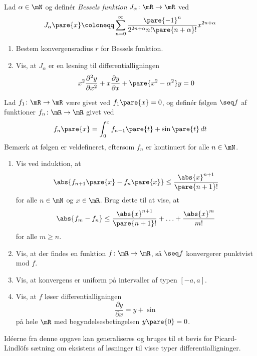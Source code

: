 \begin{opg} \hfill \\
Lad $\alpha\in\mN$ og definér \textit{Bessels funktion} $J_\alpha\colon \mR\to\mR$ ved
$$ J_\alpha\pare{x}\coloneqq \sum_{n=0}^\infty
    \frac{\pare{-1}^n}{2^{2n+\alpha}n!\pare{n+\alpha}!}x^{2n+\alpha} $$
\begin{enumerate}
    \item Bestem konvergensradius $r$ for Bessels funktion.
    
    \item Vis, at $J_\alpha$ er en løsning til differentialligningen
    $$ x^2\frac{\partial^2 y}{\partial x^2} + x\frac{\partial y}{\partial x}
        + \pare{x^2-\alpha^2}y = 0 $$
\end{enumerate}
\end{opg}

\begin{opg}
Lad $f_1\colon\mR\to\mR$ være givet ved $f_1\pare{x} = 0$, og definér følgen $\seq f$ af funktioner $f_n\colon\mR\to\mR$ givet ved
$$ f_n\pare{x} = \int_0^x f_{n-1}\pare{t} + \sin\pare{t} \,dt $$
Bemærk at følgen er veldefineret, eftersom $f_n$ er kontinuert for alle $n\in\mN$.

\begin{enumerate}
    \item Vis ved induktion, at
    $$ \abs{f_{n+1}\pare{x} - f_n\pare{x}} \leq \frac{\abs{x}^{n+1}}{\pare{n+1}!} $$
    for alle $n\in\mN$ og $x\in\mR$. Brug dette til at vise, at
    $$ \abs{f_m - f_n} \leq \frac{\abs{x}^{n+1}}{\pare{n+1}!} + \ldots + \frac{\abs{x}^m}{m!} $$
    for alle $m\geq n$. 
    
    \item Vis, at der findes en funktion $f\colon\mR\to\mR$, så $\seq f$ konvergerer punktvist mod $f$.
    
    \item Vis, at konvergens er uniform på intervaller af typen $[-a,a]$.
    
    \item Vis, at $f$ løser differentialligningen
    $$ \frac{\partial y}{\partial x} = y + \sin $$
    på hele $\mR$ med begyndelsesbetingelsen $y\pare{0} = 0$.
\end{enumerate}
Idéerne fra denne opgave kan generaliseres og bruges til et bevis for Picard-Lindlöfs sætning om eksistens af løsninger til visse typer differentialligninger.
\end{opg}